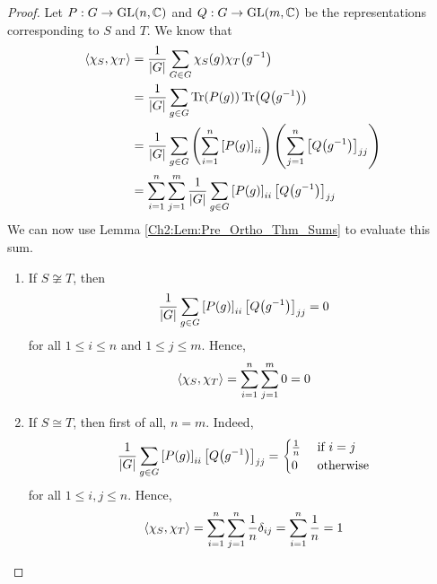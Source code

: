 \begin{proof}
    Let $P : G \to \operatorname{GL}\!\left( n, \mathbb{C} \right)$ and $Q : G \to \operatorname{GL}\!\left( m, \mathbb{C} \right)$ be the representations corresponding to $S$ and $T$. We know that
    \begin{align*}
        \left\langle \chi_S, \chi_T \right\rangle &=
        \frac{1}{\left\lvert G \right\rvert} \sum_{G \in G} \chi_S(g) \chi_T\!\left( g^{-1} \right) \\
        &= \frac{1}{\left\lvert G \right\rvert} \sum_{g \in G} \operatorname{Tr}\!\left( P(g) \right) \operatorname{Tr}\!\left( Q\!\left( g^{-1} \right) \right) \\
        &= \frac{1}{\left\lvert G \right\rvert} \sum_{g \in G} \left( \sum_{i = 1}^{n} \left[ P(g) \right]_{ii} \right)\left( \sum_{j=1}^{n} \left[ Q\!\left( g^{-1} \right) \right]_{jj} \right) \\
        &= \sum_{i=1}^{n} \sum_{j=1}^{m} \frac{1}{\left\lvert G \right\rvert} \sum_{g \in G} \left[ P(g) \right]_{ii} \left[ Q\!\left( g^{-1} \right) \right]_{jj}
    \end{align*}
    We can now use Lemma \ref{Ch2:Lem:Pre_Ortho_Thm_Sums} to evaluate this sum.
    \begin{enumerate}
        \item If $S \not\cong T$, then
        \begin{align*}
            \frac{1}{\left\lvert G \right\rvert} \sum_{g \in G} \left[ P(g) \right]_{ii} \left[ Q\!\left( g^{-1} \right) \right]_{jj} = 0
        \end{align*}
        for all $1 \leq i \leq n$ and $1 \leq j \leq m$. Hence,
        \begin{align*}
            \left\langle \chi_S, \chi_T \right\rangle = \sum_{i=1}^{n} \sum_{j=1}^{m} 0 = 0
        \end{align*}

        \item If $S \cong T$, then first of all, $n = m$. Indeed,
        \begin{align*}
            \frac{1}{\left\lvert G \right\rvert} \sum_{g \in G} \left[ P(g) \right]_{ii} \left[ Q\!\left( g^{-1} \right) \right]_{jj} =
            \begin{cases}
                \frac{1}{n} & \text{ if } i = j \\
                0 & \text{ otherwise}
            \end{cases}
        \end{align*}
        for all $1 \leq i, j \leq n$. Hence,
        \begin{align*}
            \left\langle \chi_S, \chi_T \right\rangle = \sum_{i=1}^{n} \sum_{j=1}^{n} \frac{1}{n} \delta_{ij} = \sum_{i=1}^{n} \frac{1}{n} = 1
        \end{align*}
    \end{enumerate}
\end{proof}

